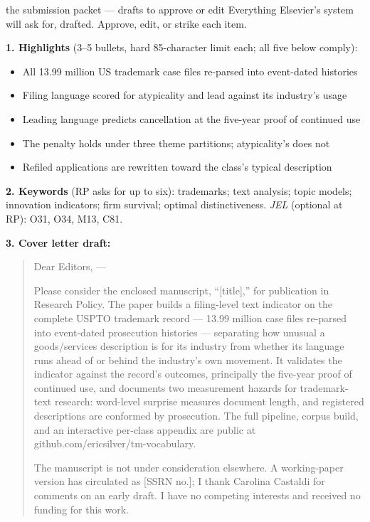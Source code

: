 \begin{ericbox}{the submission packet --- drafts to approve or edit}
Everything Elsevier's system will ask for, drafted. Approve, edit, or
strike each item.

\medskip\noindent\textbf{1. Highlights} (3--5 bullets, hard 85-character
limit each; all five below comply):
\begin{itemize}[nosep]
\item All 13.99 million US trademark case files re-parsed into event-dated histories
\item Filing language scored for atypicality and lead against its industry's usage
\item Leading language predicts cancellation at the five-year proof of continued use
\item The penalty holds under three theme partitions; atypicality's does not
\item Refiled applications are rewritten toward the class's typical description
\end{itemize}

\medskip\noindent\textbf{2. Keywords} (RP asks for up to six): trademarks;
text analysis; topic models; innovation indicators; firm survival; optimal
distinctiveness. \emph{JEL} (optional at RP): O31, O34, M13, C81.

\medskip\noindent\textbf{3. Cover letter draft:}
\begin{quote}\small
Dear Editors, ---

Please consider the enclosed manuscript, ``[title],'' for publication in
Research Policy. The paper builds a filing-level text indicator on the
complete USPTO trademark record --- 13.99 million case files re-parsed
into event-dated prosecution histories --- separating how unusual a
goods/services description is for its industry from whether its language
runs ahead of or behind the industry's own movement. It validates the
indicator against the record's outcomes, principally the five-year proof
of continued use, and documents two measurement hazards for
trademark-text research: word-level surprise measures document length,
and registered descriptions are conformed by prosecution. The full
pipeline, corpus build, and an interactive per-class appendix are public
at github.com/ericsilver/tm-vocabulary.

The manuscript is not under consideration elsewhere. A working-paper
version has circulated as [SSRN no.]; I thank Carolina Castaldi for
comments on an early draft. I have no competing interests and received no
funding for this work.
\end{quote}


\end{ericbox}
